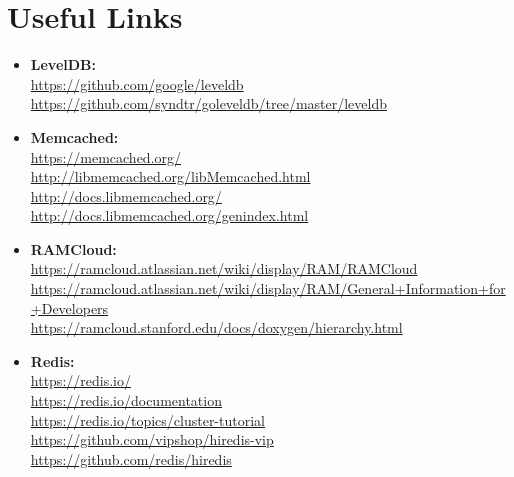 \documentclass[11pt]{article}
\begin{document}
\section{Useful Links}
\begin{itemize}
\item \textbf{LevelDB:}\\
\href{https://github.com/google/leveldb}{https://github.com/google/leveldb}\\
\href{https://github.com/syndtr/goleveldb/tree/master/leveldb}{https://github.com/syndtr/goleveldb/tree/master/leveldb}\\

\item \textbf{Memcached:}\\
\href{https://memcached.org/}{https://memcached.org/}\\
\href{http://libmemcached.org/libMemcached.html}{http://libmemcached.org/libMemcached.html}\\
\href{http://docs.libmemcached.org/}{http://docs.libmemcached.org/}\\
\href{http://docs.libmemcached.org/genindex.html}{http://docs.libmemcached.org/genindex.html}\\

\item \textbf{RAMCloud:}\\
\href{https://ramcloud.atlassian.net/wiki/display/RAM/RAMCloud}{https://ramcloud.atlassian.net/wiki/display/RAM/RAMCloud}\\
\href{https://ramcloud.atlassian.net/wiki/display/RAM/General+Information+for+Developers}{https://ramcloud.atlassian.net/wiki/display/RAM/General+Information+for+Developers}\\
\href{https://ramcloud.stanford.edu/docs/doxygen/hierarchy.html}{https://ramcloud.stanford.edu/docs/doxygen/hierarchy.html}\\

\item \textbf{Redis:}\\
\href{https://redis.io/}{https://redis.io/}\\
\href{https://redis.io/documentation}{https://redis.io/documentation}\\
\href{https://redis.io/topics/cluster-tutorial}{https://redis.io/topics/cluster-tutorial}\\
\href{https://github.com/vipshop/hiredis-vip}{https://github.com/vipshop/hiredis-vip}\\
\href{https://github.com/redis/hiredis}{https://github.com/redis/hiredis}\\

\end{itemize}
\end{document}
